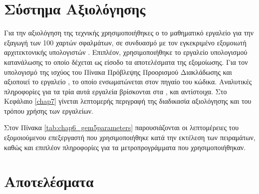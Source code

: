 \section{Σύστημα Αξιολόγησης}
\label{chap6_EvaluationSystem}

Για την αξιολόγηση της τεχνικής χρησιμοποιήθηκες ο το μαθηματικό εργαλείο \matlab για την εξαγωγή των 100 χαρτών σφαλμάτων, σε συνδυασμό με τον εγκεκριμένο εξομοιωτή αρχιτεκτονικής υπολογιστών \gem. Επιπλέον, χρησιμοποιήθηκε το εργαλείο υπολογισμού κατανάλωσης \mcpat το οποίο δέχεται ως είσοδο τα αποτελέσματα της εξομοίωσης. Για τον υπολογισμό της ισχύος του Πίνακα Πρόβλεψης Προορισμού Διακλάδωσης και αξιοποιεί το εργαλείο \cacti, το οποίο ενσωματώνεται στον πηγαίο του κώδικα. Αναλυτικές πληροφορίες για τα τρία αυτά εργαλεία βρίσκονται στα \cite{release2013mathworks}, \cite{binkert2011gem5} και \cite{li2009mcpat, muralimanohar2009cacti} αντίστοιχα. Στο Κεφάλαιο \ref{chap7} γίνεται λεπτομερής περιγραφή της διαδικασία αξιολόγησης και του τρόπου χρήσης των εργαλείων.
\par
Στον Πίνακα \ref{tab:chap6_gem5parameters} παρουσιάζονται οι λεπτομέρειες του εξομοιούμενου  επεξεργαστή που χρησιμοποιήθηκε κατά την εκτέλεση των πειραμάτων, καθώς και επιπλέον πληροφορίες για τα μετροπρογράμματα που χρησιμοποιήθηκαν.




\section{Αποτελέσματα \gem}
\label{chap6_gem5Results}

